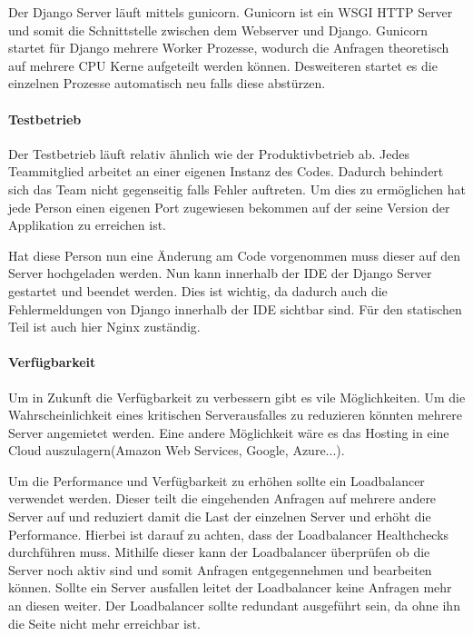 
Der Django Server läuft mittels gunicorn. Gunicorn ist ein \gls{WSGI} HTTP Server und somit die Schnittstelle zwischen dem Webserver und Django. Gunicorn startet für Django mehrere Worker Prozesse, wodurch die Anfragen theoretisch auf mehrere CPU Kerne aufgeteilt werden können. Desweiteren startet es die einzelnen Prozesse automatisch neu falls diese abstürzen.
\paragraph{Testbetrieb}
Der Testbetrieb läuft relativ ähnlich wie der Produktivbetrieb ab. Jedes Teammitglied arbeitet an einer eigenen Instanz des Codes. Dadurch behindert sich das Team nicht gegenseitig falls Fehler auftreten. Um dies zu ermöglichen hat jede Person einen eigenen Port zugewiesen bekommen auf der seine Version der Applikation zu erreichen ist. 

Hat diese Person nun eine Änderung am Code vorgenommen muss dieser auf den Server hochgeladen werden. Nun kann innerhalb der IDE der Django Server gestartet und beendet werden. Dies ist wichtig, da dadurch auch die Fehlermeldungen von Django innerhalb der \gls{IDE} sichtbar sind. Für den statischen Teil ist auch hier Nginx zuständig.

\newpage

\paragraph{Verfügbarkeit}
Um in Zukunft die Verfügbarkeit zu verbessern gibt es vile Möglichkeiten. Um die Wahrscheinlichkeit eines kritischen Serverausfalles zu reduzieren könnten mehrere Server angemietet werden. Eine andere Möglichkeit wäre es das Hosting in eine Cloud auszulagern(Amazon Web Services, Google, Azure...). 

Um die Performance und Verfügbarkeit zu erhöhen sollte ein Loadbalancer verwendet werden. Dieser teilt die eingehenden Anfragen auf mehrere andere Server auf und reduziert damit die Last der einzelnen Server und erhöht die Performance. Hierbei ist darauf zu achten, dass der Loadbalancer Healthchecks durchführen muss. Mithilfe dieser kann der Loadbalancer überprüfen ob die Server noch aktiv sind und somit Anfragen entgegennehmen und bearbeiten können. Sollte ein Server ausfallen leitet der Loadbalancer keine Anfragen mehr an diesen weiter. Der Loadbalancer sollte redundant ausgeführt sein, da ohne ihn die Seite nicht mehr erreichbar ist. 

